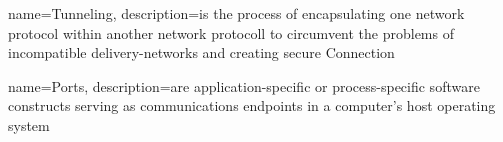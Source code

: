 {
  name=Tunneling,
  description={is the process of encapsulating one network protocol within another network protocoll to circumvent the problems of incompatible delivery-networks and creating secure Connection}
}

{
  name=Ports,
  description={are application-specific or process-specific software constructs serving as communications endpoints in a computer's host operating system}
}
